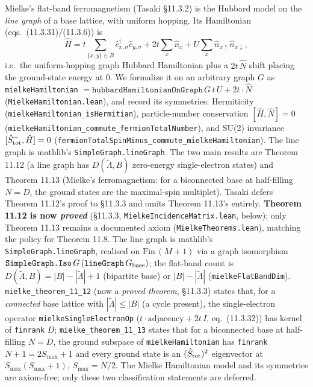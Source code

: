 \documentclass[a4paper,11pt]{article}
\begin{document}
\noindent Mielke's flat-band ferromagnetism (Tasaki §11.3.2) is the Hubbard model
on the \emph{line graph} of a base lattice, with uniform hopping. Its Hamiltonian
(eqs.~(11.3.31)/(11.3.6)) is
\[
  \hat H = t\sum_{\{x,y\}\in B}\hat c^\dagger_{x,\sigma}\hat c_{y,\sigma}
    + 2t\sum_x \hat n_x + U\sum_x \hat n_{x\uparrow}\hat n_{x\downarrow},
\]
i.e.\ the uniform-hopping graph Hubbard Hamiltonian plus a $2t\,\hat N$ shift placing
the ground-state energy at $0$. We formalize it on an arbitrary graph $G$ as
\texttt{mielkeHamiltonian} $= \texttt{hubbardHamiltonianOnGraph}\,G\,t\,U +
2t\cdot\hat N$ (\texttt{MielkeHamiltonian.lean}), and record its symmetries:
Hermiticity (\texttt{mielkeHamiltonian\_isHermitian}), particle-number conservation
$[\hat H,\hat N]=0$ (\texttt{mielkeHamiltonian\_commute\_fermionTotalNumber}), and
SU(2) invariance $[\hat S^-_{\rm tot},\hat H]=0$
(\texttt{fermionTotalSpinMinus\_commute\_mielkeHamiltonian}). The line graph is
mathlib's \texttt{SimpleGraph.lineGraph}. The two main results are Theorem 11.12
(a line graph has $D(\tilde\Lambda,B)$ zero-energy single-electron states) and
Theorem 11.13 (Mielke's ferromagnetism: for a biconnected base at half-filling
$N=D$, the ground states are the maximal-spin multiplet). Tasaki defers Theorem 11.12's
proof to §11.3.3 and omits Theorem 11.13's entirely. \textbf{Theorem 11.12 is now
\emph{proved}} (§11.3.3, \texttt{MielkeIncidenceMatrix.lean}, below); only Theorem 11.13
remains a documented axiom (\texttt{MielkeTheorems.lean}), matching the policy for
Theorem 11.8.
The line graph is mathlib's \texttt{SimpleGraph.lineGraph}, realised on
$\mathrm{Fin}\,(M{+}1)$ via a graph isomorphism
$\texttt{SimpleGraph.Iso}\,G\,(\texttt{lineGraph}\,G_{\rm base})$; the flat-band
count is $D(\tilde\Lambda,B) = |B|-|\tilde\Lambda|+1$ (bipartite base) or
$|B|-|\tilde\Lambda|$ (\texttt{mielkeFlatBandDim}). \texttt{mielke\_theorem\_11\_12}
(now a \emph{proved theorem}, §11.3.3) states that, for a \emph{connected} base lattice
with $|\tilde\Lambda|\le|B|$ (a cycle present), the single-electron operator
\texttt{mielkeSingleElectronOp} ($t\cdot\text{adjacency}+2t\,I$, eq.~(11.3.32)) has
kernel of \texttt{finrank} $D$;
\texttt{mielke\_theorem\_11\_13} states that for a biconnected base at half-filling
$N=D$, the ground subspace of \texttt{mielkeHamiltonian} has \texttt{finrank}
$N{+}1=2S_{\max}{+}1$ and every ground state is an $(\hat S_{\rm tot})^2$
eigenvector at $S_{\max}(S_{\max}{+}1)$, $S_{\max}=N/2$. The Mielke Hamiltonian
model and its symmetries are axiom-free; only these two classification statements
are deferred.
\end{document}
